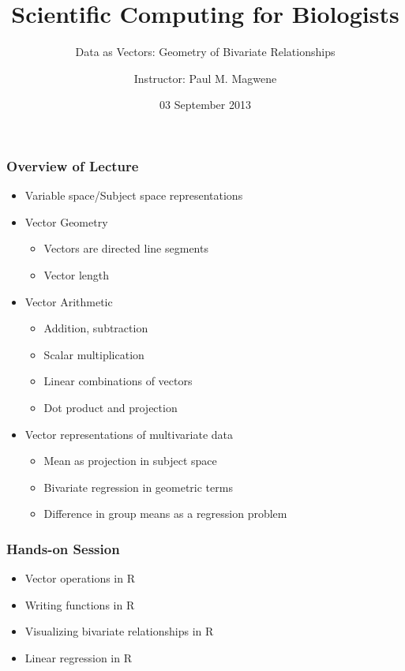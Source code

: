 \documentclass{beamer}
\title{Scientific Computing for Biologists}
\subtitle{Data as Vectors: Geometry of Bivariate Relationships} %
\author[P. Magwene]{Instructor: Paul M. Magwene}
\date{03 September 2013}
\begin{document}
\begin{frame}
\titlepage
\end{frame}

\begin{frame}
  \frametitle{Overview of Lecture}

\begin{itemize}
        \item Variable space/Subject space representations
		\item Vector Geometry
		\begin{itemize}
			\item Vectors are directed line segments
			\item Vector length
		\end{itemize}
		\item Vector Arithmetic
		\begin{itemize}
			\item Addition, subtraction
			\item Scalar multiplication
			\item Linear combinations of vectors
			\item Dot product and projection
		\end{itemize}
		\item Vector representations of multivariate data
        \begin{itemize}
			\item Mean as projection in subject space
			\item Bivariate regression in geometric terms
			\item Difference in group means as a regression problem
		\end{itemize}
\end{itemize}

\end{frame}

\begin{frame}
  \frametitle{Hands-on Session}
		\begin{itemize}
		  \item Vector operations in R
		  \item Writing functions in R
		  \item Visualizing bivariate relationships in R
		  \item Linear regression in R
	 \end{itemize}
\end{frame}
\end{document}
